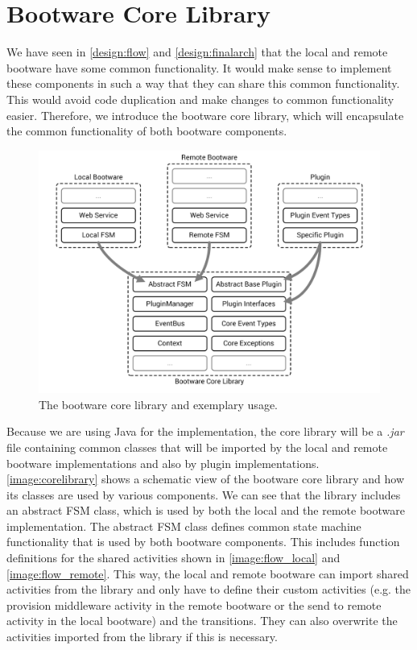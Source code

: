 \section{Bootware Core Library}

We have seen in \autoref{design:flow} and \autoref{design:finalarch} that the local and remote bootware have some common functionality.
It would make sense to implement these components in such a way that they can share this common functionality.
This would avoid code duplication and make changes to common functionality easier.
Therefore, we introduce the bootware core library, which will encapsulate the common functionality of both bootware components.

\begin{figure}[!htbp]
	\centering
	\includegraphics[resolution=600]{implementation/assets/core_library}
	\caption{The bootware core library and exemplary usage.}
	\label{image:corelibrary}
\end{figure}

Because we are using Java for the implementation, the core library will be a \textit{.jar} file containing common classes that will be imported by the local and remote bootware implementations and also by plugin implementations.
\autoref{image:corelibrary} shows a schematic view of the bootware core library and how its classes are used by various components.
We can see that the library includes an abstract FSM class, which is used by both the local and the remote bootware implementation.
The abstract FSM class defines common state machine functionality that is used by both bootware components.
This includes function definitions for the shared activities shown in \autoref{image:flow_local} and \autoref{image:flow_remote}.
This way, the local and remote bootware can import shared activities from the library and only have to define their custom activities (e.g. the provision middleware activity in the remote bootware or the send to remote activity in the local bootware) and the transitions.
They can also overwrite the activities imported from the library if this is necessary.

